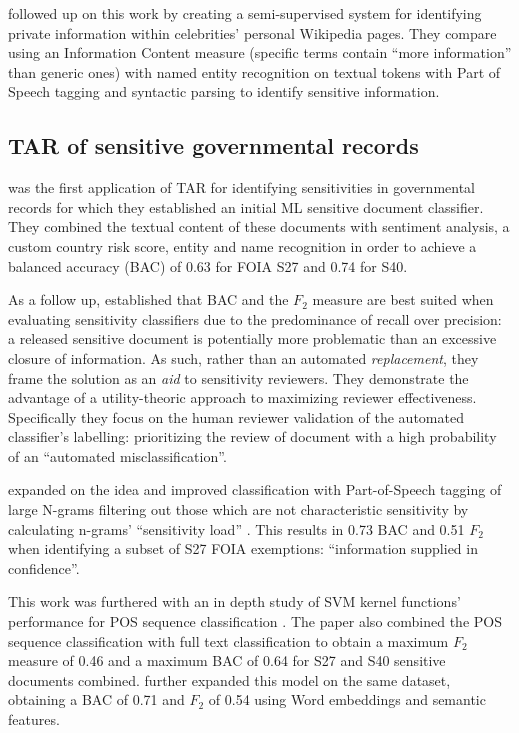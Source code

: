 \documentclass[\version]{l4proj}
\begin{document}
\textcite{sanchezDetectingSensitiveInformation2012} followed up on this work by creating a semi-supervised system for identifying private information within celebrities' personal Wikipedia pages.
They compare using an Information Content measure (specific terms contain ``more information'' than generic ones) with named entity recognition on textual tokens with Part of Speech tagging and syntactic parsing to identify sensitive information.

\subsection{TAR of sensitive governmental records}

\textcite{mcdonaldClassifierDigitalSensitivity2014} was the first application of TAR for identifying sensitivities in governmental records for which they established an initial ML sensitive document classifier.
They combined the textual content of these documents with sentiment analysis, a custom country risk score, entity and name recognition in order to achieve a balanced accuracy (BAC) of 0.63 for FOIA S27 and 0.74 for S40.

As a follow up, \textcite{berardiSemiAutomatedTextClassification2015} established that BAC and the \(F_{2}\) measure are best suited when evaluating sensitivity classifiers due to the predominance of recall over precision: a released sensitive document is potentially more problematic than an excessive closure of information.
As such, rather than an automated \textit{replacement}, they frame the solution as an \textit{aid} to sensitivity reviewers.
They demonstrate the advantage of a utility-theoric approach to maximizing reviewer effectiveness.
Specifically they focus on the human reviewer validation of the automated classifier's labelling: prioritizing the review of document with a high probability of an ``automated misclassification''.

\textcite{mcdonaldUsingPartofSpeechNgrams2015} expanded on the idea and improved classification with Part-of-Speech tagging of large N-grams filtering out those which are not characteristic sensitivity by calculating n-grams' ``sensitivity load'' \autocite[2]{mcdonaldUsingPartofSpeechNgrams2015}.
This results in 0.73 BAC and 0.51 \(F_{2}\) when identifying a subset of S27 FOIA exemptions: ``information supplied in confidence''.

This work was furthered with an in depth study of SVM kernel functions' performance for POS sequence classification \autocite{mcdonaldStudySVMKernel2017}.
The paper also combined the POS sequence classification with full text classification to obtain a maximum \(F_{2}\) measure of 0.46 and a maximum BAC of 0.64 for S27 and S40 sensitive documents combined.
\textcite{mcdonaldEnhancingSensitivityClassification2017} further expanded this model on the same dataset, obtaining a BAC of 0.71 and \(F_{2}\) of 0.54 using Word embeddings and semantic features.
\end{document}
